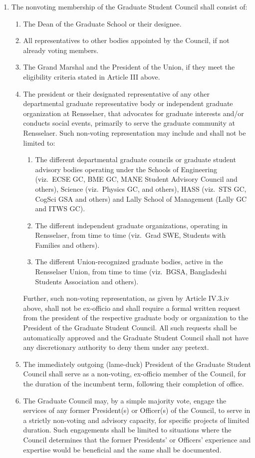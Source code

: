 \documentclass{uniondoc}
\begin{document}
\begin{enumerate}
\begin{enumerate}
\begin{enumerate}
    \end{enumerate}
  \end{enumerate}
\item The nonvoting membership of the Graduate Student Council shall consist of:
  \begin{enumerate}
  \item The Dean of the Graduate School or their designee.
  \item All representatives to other bodies appointed by the Council, if not already voting members.
  \item The Grand Marshal and the President of the Union, if they meet the eligibility criteria stated in Article III above.
  \item The president or their designated representative of any other departmental graduate representative body or independent graduate organization at Rensselaer, that advocates for graduate interests and/or conducts social events, primarily to serve the graduate community at Rensselaer. Such non-voting representation may include and shall not be limited to:
    \begin{enumerate}
    \item The different departmental graduate councils or graduate student advisory bodies operating under the Schools of Engineering (viz.\ ECSE GC, BME GC, MANE Student Advisory Council and others), Science (viz.\ Physics GC, and others), HASS (viz.\ STS GC, CogSci GSA and others) and Lally School of Management (Lally GC and ITWS GC).
    \item The different independent graduate organizations, operating in Rensselaer, from time to time (viz.\ Grad SWE, Students with Families and others).
    \item The different Union-recognized graduate bodies, active in the Rensselaer Union, from time to time (viz.\ BGSA, Bangladeshi Students Association and others).
    \end{enumerate}
  Further, such non-voting representation, as given by Article IV.3.iv above, shall not be ex-officio and shall require a formal written request from the president of the respective graduate body or organization to the President of the Graduate Student Council. All such requests shall be automatically approved and the Graduate Student Council shall not have any discretionary authority to deny them under any pretext.

  \item The immediately outgoing (lame-duck) President of the Graduate Student Council shall serve as a non-voting, ex-officio member of the Council, for the duration of the incumbent term, following their completion of office.
  \item The Graduate Council may, by a simple majority vote, engage the services of any former President(s) or Officer(s) of the Council, to serve in a strictly non-voting and advisory capacity, for specific projects of limited duration. Such engagements shall be limited to situations where the Council determines that the former Presidents' or Officers' experience and expertise would be beneficial and the same shall be documented.


\end{enumerate}
\end{enumerate}
\end{document}
